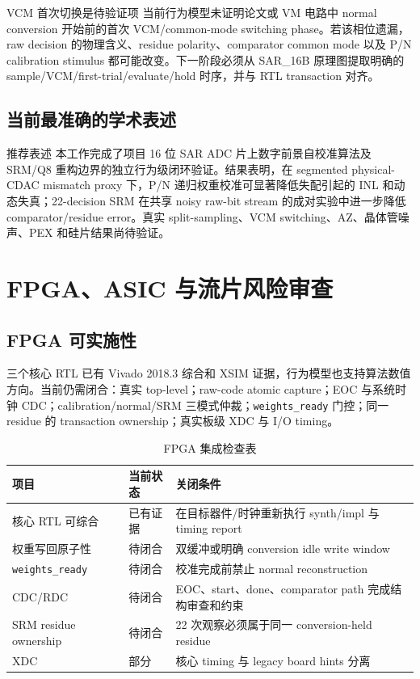 \documentclass[UTF8,fontset=none,a4paper,11pt,openany]{ctexrep}
\begin{document}
\begin{riskbox}{VCM 首次切换是待验证项}
当前行为模型未证明论文或 VM 电路中 normal conversion 开始前的首次 VCM/common-mode switching phase。若该相位遗漏，raw decision 的物理含义、residue polarity、comparator common mode 以及 P/N calibration stimulus 都可能改变。下一阶段必须从 SAR\_16B 原理图提取明确的 sample/VCM/first-trial/evaluate/hold 时序，并与 RTL transaction 对齐。
\end{riskbox}

\section{当前最准确的学术表述}

\begin{evidencebox}{推荐表述}
本工作完成了项目 16 位 SAR ADC 片上数字前景自校准算法及 SRM/Q8 重构边界的独立行为级闭环验证。结果表明，在 segmented physical-CDAC mismatch proxy 下，P/N 递归权重校准可显著降低失配引起的 INL 和动态失真；22-decision SRM 在共享 noisy raw-bit stream 的成对实验中进一步降低 comparator/residue error。真实 split-sampling、VCM switching、AZ、晶体管噪声、PEX 和硅片结果尚待验证。
\end{evidencebox}

\chapter{FPGA、ASIC 与流片风险审查}

\section{FPGA 可实施性}

三个核心 RTL 已有 Vivado 2018.3 综合和 XSIM 证据，行为模型也支持算法数值方向。当前仍需闭合：真实 top-level；raw-code atomic capture；EOC 与系统时钟 CDC；calibration/normal/SRM 三模式仲裁；\texttt{weights\_ready} 门控；同一 residue 的 transaction ownership；真实板级 XDC 与 I/O timing。

\begin{table}[H]
\centering
\caption{FPGA 集成检查表}
\label{tab:fpga-risks}
\begin{tabularx}{\textwidth}{p{}p{}X}
\toprule
项目 & 当前状态 & 关闭条件\\
\midrule
核心 RTL 可综合 & 已有证据 & 在目标器件/时钟重新执行 synth/impl 与 timing report\\
权重写回原子性 & 待闭合 & 双缓冲或明确 conversion idle write window\\
\texttt{weights\_ready} & 待闭合 & 校准完成前禁止 normal reconstruction\\
CDC/RDC & 待闭合 & EOC、start、done、comparator path 完成结构审查和约束\\
SRM residue ownership & 待闭合 & 22 次观察必须属于同一 conversion-held residue\\
XDC & 部分 & 核心 timing 与 legacy board hints 分离\\
\bottomrule
\end{tabularx}
\end{table}
\end{document}

